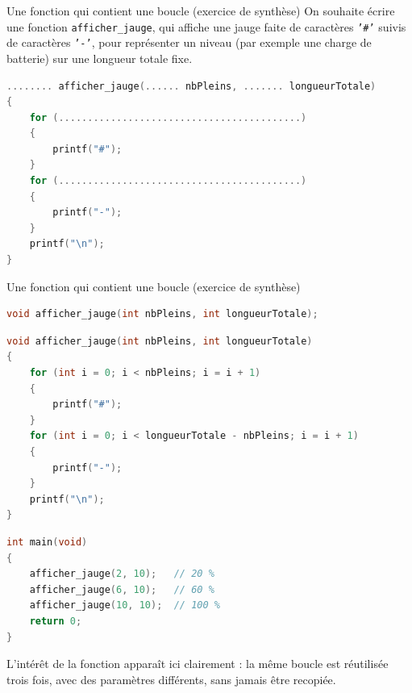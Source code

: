 \begin{UPSTIexercice}{Une fonction qui contient une boucle (exercice de synthèse)}
    On souhaite écrire une fonction \texttt{afficher\_jauge}, qui affiche une jauge faite de caractères \texttt{'\#'} suivis de caractères \texttt{'-'}, pour représenter un niveau (par exemple une charge de batterie) sur une longueur totale fixe.

    \begin{lstlisting}[language=C]
........ afficher_jauge(...... nbPleins, ....... longueurTotale)
{
    for (..........................................)
    {
        printf("#");
    }
    for (..........................................)
    {
        printf("-");
    }
    printf("\n");
}
    \end{lstlisting}
\end{UPSTIexercice}

\begin{UPSTIprofOnlyEnv}
    \begin{UPSTIcorrectionP}{Une fonction qui contient une boucle (exercice de synthèse)}
        \begin{lstlisting}[language=C]
void afficher_jauge(int nbPleins, int longueurTotale);
        \end{lstlisting}
        \begin{lstlisting}[language=C]
void afficher_jauge(int nbPleins, int longueurTotale)
{
    for (int i = 0; i < nbPleins; i = i + 1)
    {
        printf("#");
    }
    for (int i = 0; i < longueurTotale - nbPleins; i = i + 1)
    {
        printf("-");
    }
    printf("\n");
}
        \end{lstlisting}
        \begin{lstlisting}[language=C]
int main(void)
{
    afficher_jauge(2, 10);   // 20 %
    afficher_jauge(6, 10);   // 60 %
    afficher_jauge(10, 10);  // 100 %
    return 0;
}
        \end{lstlisting}
        L'intérêt de la fonction apparaît ici clairement : la même boucle est réutilisée trois fois, avec des paramètres différents, sans jamais être recopiée.
    \end{UPSTIcorrectionP}
\end{UPSTIprofOnlyEnv}


